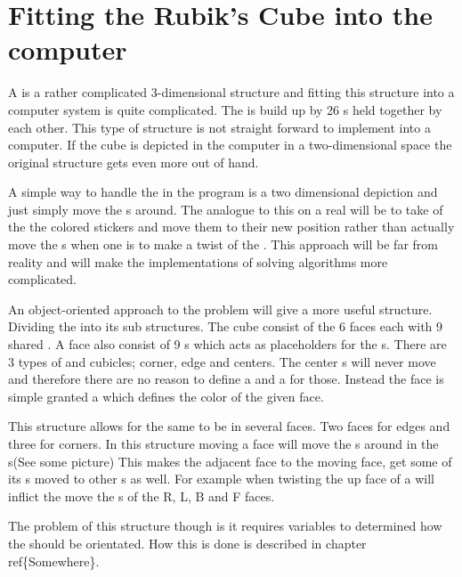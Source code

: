 \chapter{Fitting the Rubik's Cube into the computer}
A \rubik{} is a rather complicated 3-dimensional structure and fitting this structure into a computer system is quite complicated. 
The \rubik{} is build up by 26 \cpiece{}s held together by each other. 
This type of structure is not straight forward to implement into a computer. If the cube is depicted in the computer in a two-dimensional space the original \rubik{} structure gets even more out of hand.%

A simple way to handle the \rubik{} in the program is a two dimensional depiction and  just simply move the \facelet{}s around.
The analogue to this on a real \rubik{} will be to take of the the colored stickers and move them to their new position rather than actually move the \cubie{}s when one is to make a twist of the \rubik{}.
This approach will be far from reality and will make the implementations of solving algorithms more complicated.

An object-oriented approach to the problem will give a more useful structure. 
Dividing the \rubik{} into its sub structures. 
The cube consist of the 6 faces each with 9 shared \cpiece{}. 
A face also consist of 9 \cubicle{}s which acts as placeholders for the \cpiece{}s. 
There are 3 types of \cpiece{} and cubicles; corner, edge and centers. 
The center \cpiece{}s will never move and therefore there are no reason to define a \cubicle{} and a \cpiece{} for those. Instead the face is simple granted a \facelet{} which defines the color of the given face.

This structure allows for the same \cubicle{} to be in several faces. 
Two faces for edges and three for corners. 
In this structure moving a face will move the \cpiece{}s around in the \cubicle{}s(See some picture) This makes the adjacent face to the moving face, get some of its \cpiece{}s moved to other \cubicle{}s as well. 
For example when twisting the up face of a \rubik{} will inflict the move the \cpiece{}s of the R, L, B and F faces. 

The problem of this structure though is it requires variables to determined how the \facelet{} should be orientated. 
How this is done is described in chapter ref\{Somewhere\}.
